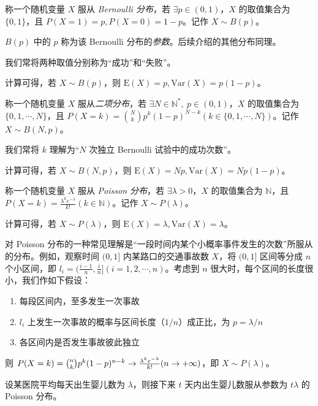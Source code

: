 \documentclass[../main.tex]{subfiles}
\begin{document}
\begin{definition}\label{def:2.3.1}
称一个随机变量 $X$ 服从 \emph{Bernoulli 分布}，若 $\exists p\in(0,1)$，$X$ 的取值集合为 $\{0,1\}$，且 $P(X=1)=p,P(X=0)=1-p$。记作 $X\sim B(p)$。
\end{definition}

$B(p)$ 中的 $p$ 称为该 Bernoulli 分布的\emph{参数}。后续介绍的其他分布同理。

我们常将两种取值分别称为“成功”和“失败”。

计算可得，若 $X\sim B(p)$，则 $\mathrm{E}(X)=p,\mathrm{Var}(X)=p(1-p)$。

\begin{definition}\label{def:2.3.2}
称一个随机变量 $X$ 服从\emph{二项分布}，若 $\exists N\in\mathbb{N}^*,\ p\in(0,1)$，$X$ 的取值集合为 $\{0,1,\cdots,N\}$，且 $P(X=k)=\binom{N}{k}p^k(1-p)^{N-k}(k\in\{0,1,\cdots,N\})$。记作 $X\sim B(N,p)$。
\end{definition}

我们常将 $k$ 理解为“$N$ 次独立 Bernoulli 试验中的成功次数”。

计算可得，若 $X\sim B(N,p)$，则 $\mathrm{E}(X)=Np,\mathrm{Var}(X)=Np(1-p)$。

\begin{definition}\label{def:2.3.3}
称一个随机变量 $X$ 服从 \emph{Poisson 分布}，若 $\exists\lambda>0$，$X$ 的取值集合为 $\mathbb{N}$，且 $P(X=k)=\frac{\lambda^ke^{-\lambda}}{k!}(k\in\mathbb{N})$。记作 $X\sim P(\lambda)$。
\end{definition}

计算可得，若 $X\sim P(\lambda)$，则 $\mathrm{E}(X)=\lambda,\mathrm{Var}(X)=\lambda$。

对 Poisson 分布的一种常见理解是“一段时间内某个小概率事件发生的次数”所服从的分布。例如，观察时间 $(0,1]$ 内某路口的交通事故数 $X$，将 $(0,1]$ 区间等分成 $n$ 个小区间，即 $l_i=(\frac{i-1}{n},\frac{i}{n}](i=1,2,\cdots,n)$。考虑到 $n$ 很大时，每个区间的长度很小，我们作如下假设：
\begin{enumerate}
    \item 每段区间内，至多发生一次事故
    \item $l_i$ 上发生一次事故的概率与区间长度（$1/n$）成正比，为 $p=\lambda/n$
    \item 各区间内是否发生事故彼此独立
\end{enumerate}

则 $P(X=k)=\tbinom{n}{k}p^k(1-p)^{n-k}\rightarrow \frac{\lambda^ke^{-\lambda}}{k!}(n\rightarrow+\infty)$，即 $X\sim P(\lambda)$。

\begin{example}
设某医院平均每天出生婴儿数为 $\lambda$，则接下来 $t$ 天内出生婴儿数服从参数为 $t\lambda$ 的 Poisson 分布。
\end{example}
\end{document}
